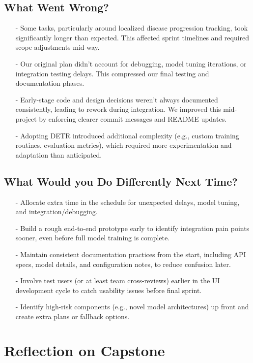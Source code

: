 \documentclass{article}
\begin{document}
\subsection{What Went Wrong?}
\begin{enumerate}
    \item[-] Some tasks, particularly around localized disease progression tracking, took significantly longer than expected. This affected sprint timelines and required scope adjustments mid-way.
    \item[-] Our original plan didn't account for debugging, model tuning iterations, or integration testing delays. This compressed our final testing and documentation phases.
    \item[-] Early-stage code and design decisions weren't always documented consistently, leading to rework during integration. We improved this mid-project by enforcing clearer commit messages and README updates.
    \item[-] Adopting DETR introduced additional complexity (e.g., custom training routines, evaluation metrics), which required more experimentation and adaptation than anticipated.
\end{enumerate}

\subsection{What Would you Do Differently Next Time?}

\begin{enumerate}
    \item[-] Allocate extra time in the schedule for unexpected delays, model tuning, and integration/debugging.
    \item[-] Build a rough end-to-end prototype early to identify integration pain points sooner, even before full model training is complete.
    \item[-] Maintain consistent documentation practices from the start, including API specs, model details, and configuration notes, to reduce confusion later.
    \item[-] Involve test users (or at least team cross-reviews) earlier in the UI development cycle to catch usability issues before final sprint.
    \item[-] Identify high-risk components (e.g., novel model architectures) up front and create extra plans or fallback options.
\end{enumerate}

\section{Reflection on Capstone}
\end{document}
